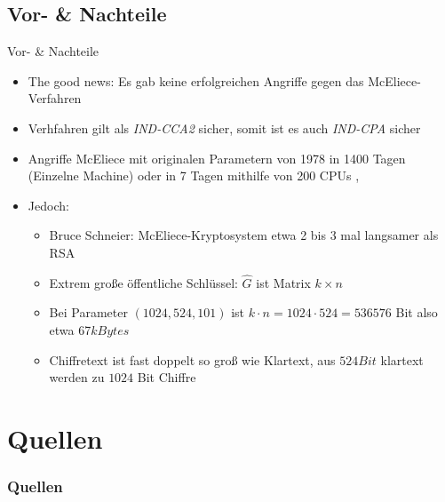 \documentclass[11pt%
,aspectratio=169%
]{beamer}
\begin{document}
\subsection{Vor- \& Nachteile}
\begin{frame}{Vor- \& Nachteile}
    \begin{itemize}
        \item The good news: Es gab keine erfolgreichen Angriffe gegen das McEliece-Verfahren
        \item Verhfahren gilt als  \emph{IND-CCA2} \cite{dottling2012cca2} sicher, somit ist es auch \emph{IND-CPA} sicher \cite{nojima2008semantic}
        \item Angriffe McEliece mit originalen Parametern von 1978 in 1400 Tagen (Einzelne Machine) oder in 7 Tagen mithilfe von 200 CPUs \cite{baldi2016enhanced}, \cite{canteaut1998cryptanalysis}
        \item Jedoch:
        \begin{itemize}
            \item Bruce Schneier: McEliece-Kryptosystem etwa 2 bis 3 mal langsamer als RSA \cite[S. 479ff]{Schneier2007Applied}
            \item Extrem große öffentliche Schlüssel: $\hat{G}$ ist Matrix $k \times n$
            \item Bei Parameter $(1024,524,101)$ ist $k \cdot n = 1024 \cdot 524 = 536576$ Bit also etwa 67$kBytes$
            \item Chiffretext ist fast doppelt so groß wie Klartext, aus $524 Bit$ klartext werden zu $1024$ Bit Chiffre 
        \end{itemize}
     \end{itemize}
\end{frame}

\section{Quellen}
\appendix
\begin{frame}[allowframebreaks]
  \frametitle<presentation>{Quellen}
\printbibliography
\end{frame}
\end{document}
